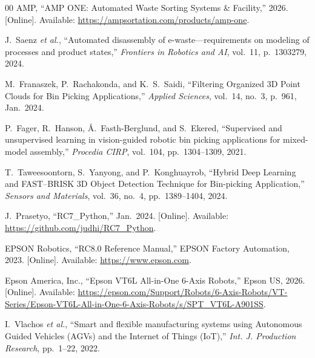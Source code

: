 \documentclass{MIPRO}
\begin{document}
\begin{thebibliography}{00}
AMP, ``AMP ONE: Automated Waste Sorting Systems \& Facility,'' 2026. [Online]. Available: \url{https://ampsortation.com/products/amp-one}.

J.~Saenz \textit{et al.}, ``Automated disassembly of e-waste---requirements on modeling of processes and product states,'' \textit{Frontiers in Robotics and AI}, vol.~11, p.~1303279, 2024.

M.~Franaszek, P.~Rachakonda, and K.~S.~Saidi, ``Filtering Organized 3D Point Clouds for Bin Picking Applications,'' \textit{Applied Sciences}, vol.~14, no.~3, p.~961, Jan.~2024.

P.~Fager, R.~Hanson, \AA.~Fasth-Berglund, and S.~Ekered, ``Supervised and unsupervised learning in vision-guided robotic bin picking applications for mixed-model assembly,'' \textit{Procedia CIRP}, vol.~104, pp.~1304--1309, 2021.

T.~Taweesoontorn, S.~Yanyong, and P.~Konghuayrob, ``Hybrid Deep Learning and FAST--BRISK 3D Object Detection Technique for Bin-picking Application,'' \textit{Sensors and Materials}, vol.~36, no.~4, pp.~1389--1404, 2024.

J.~Prasetyo, ``RC7\_Python,'' Jan.~2024. [Online]. Available: \url{https://github.com/judhi/RC7_Python}.

EPSON Robotics, ``RC8.0 Reference Manual,'' EPSON Factory Automation, 2023. [Online]. Available: \url{https://www.epson.com}.

Epson America, Inc., ``Epson VT6L All-in-One 6-Axis Robots,'' Epson US, 2026. [Online]. Available: \url{https://epson.com/Support/Robots/6-Axis-Robots/VT-Series/Epson-VT6L-All-in-One-6-Axis-Robots/s/SPT_VT6L-A901SS}.

I.~Vlachos \textit{et al.}, ``Smart and flexible manufacturing systems using Autonomous Guided Vehicles (AGVs) and the Internet of Things (IoT),'' \textit{Int. J. Production Research}, pp.~1--22, 2022.
\end{thebibliography}
\end{document}
